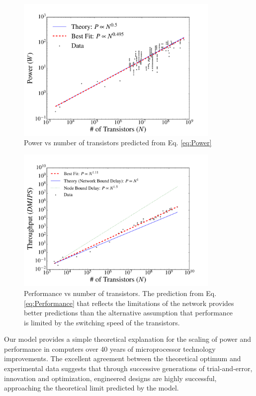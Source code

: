 \documentclass[12pt]{article}
\begin{document}
\begin{figure}[!h]
\centering
\includegraphics[height=70mm]{Figures/ChipsPowerScaling.pdf}
\caption{Power vs number of transistors predicted from Eq. \ref{eq:Power}}
\label{fig:power}
\end{figure}

\begin{figure}[!h]
\centering
\includegraphics[height=70mm]{Figures/ChipsThroughputScaling.pdf}
\caption{Performance vs number of transistors. The prediction from Eq. \ref{eq:Performance} that reflects the limitations of the network provides better predictions than the alternative assumption that performance is limited by the switching speed of the transistors.}
\label{fig:throughput}
\end{figure}

Our model provides a simple theoretical explanation for the scaling of power
and performance in computers over 40 years of microprocessor technology
improvements.  The excellent agreement between the theoretical optimum and
experimental data suggests that through successive generations of
trial-and-error, innovation and optimization, engineered designs are highly
successful, approaching the theoretical limit predicted by the model.
\end{document}

